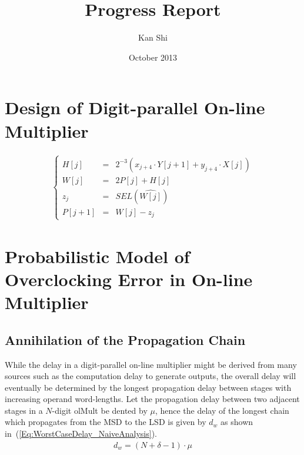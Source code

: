 \documentclass[a4paper, 11pt]{article}
\title{Progress Report}
\author{Kan Shi}
\date{October 2013}
\begin{document}
\maketitle
\vspace{-10mm}

\section{Design of Digit-parallel On-line Multiplier}
\begin{eqnarray}\label{Eq:OnlineMult}
  \left\{\begin{matrix}
    H[j] & = & 2^{-3}(x_{j+4}\cdot Y[j+1]+y_{j+4}\cdot X[j])\\
    W[j] & = & 2P[j]+H[j]\\
    z_j  & = & SEL(\widehat{W[j]})\\
    P[j+1] & = & W[j]-z_j
  \end{matrix}\right.
\end{eqnarray}


\section{Probabilistic Model of Overclocking Error in On-line Multiplier}
\subsection{Annihilation of the Propagation Chain}\label{subSec:AnnihilationOfChain}

While the delay in a digit-parallel on-line multiplier might be derived from many sources such as the computation delay to generate outputs, the overall delay will eventually be determined by the longest propagation delay between stages with increasing operand word-lengths. Let the propagation delay between two adjacent stages in a $N$-digit olMult be dented by $\mu$, hence the delay of the longest chain which propagates from the MSD to the LSD is given by $d_w$ as shown in~(\ref{Eq:WorstCaseDelay_NaiveAnalysis}).
\begin{eqnarray}\label{Eq:WorstCaseDelay_NaiveAnalysis}
  d_w = (N+\delta-1)\cdot \mu
\end{eqnarray}
\end{document}
